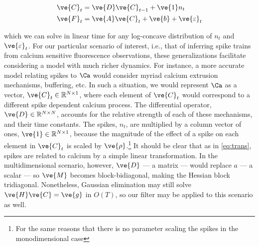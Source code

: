 \documentclass[12pt]{article}
\begin{document}
\begin{subequations} \label{eq:SS}
\begin{align}
\ve{C}_t &= \ve{D} \ve{C}_{t-1} + \ve{1} n_t \label{eq:SSa} \\
\ve{F}_t &= \ve{A} \ve{C}_t + \ve{b} + \ve{\varepsilon}_t \label{eq:SSb}
\end{align}
\end{subequations}

\noindent which we can solve in linear time for any log-concave distribution of $n_t$ and $\ve{\varepsilon}_t$.  For our particular scenario of interest, i.e., that of inferring spike trains from calcium sensitive fluorescence observations, these generalizations facilitate considering a model with much richer dynamics.  For instance, a more accurate model relating spikes to $\Ca$ would consider myriad calcium extrusion mechanisms, buffering, etc. In such a situation, we would represent $\Ca$ as a vector, $\ve{C}_t \in \mathbb{R}^{N \times 1}$, where each element of $\ve{C}_t$ would correspond 
%
%
%
to a different spike dependent calcium process. The differential operator, $\ve{D} \in \mathbb{R}^{N \times N}$, accounts for the relative strength of each of these mechanisms, and their time constants. The spikes, $n_t$, are multiplied by a column vector of ones, $\ve{1} \in \mathbb{R}^{N \times 1}$, because the magnitude of the effect of a spike on each element in $\ve{C}_t$ is scaled by $\ve{\rho}$.\footnote{For the same reasons that there is no parameter scaling the spikes in the monodimensional case} It should be clear that as in \eqref{eq:trans}, spikes are related to calcium by a simple linear transformation.  In the multidimensional scenario, however, $\ve{D}$ --- a matrix --- would replace $a$ --- a scalar ---  so $\ve{M}$ becomes block-bidiagonal, making the Hessian block tridiagonal.  Nonetheless, Gaussian elimination may still solve $\ve{H}\ve{C}=\ve{g}$ in $O(T)$, so our filter may be applied to this scenario as well.
\end{document}

